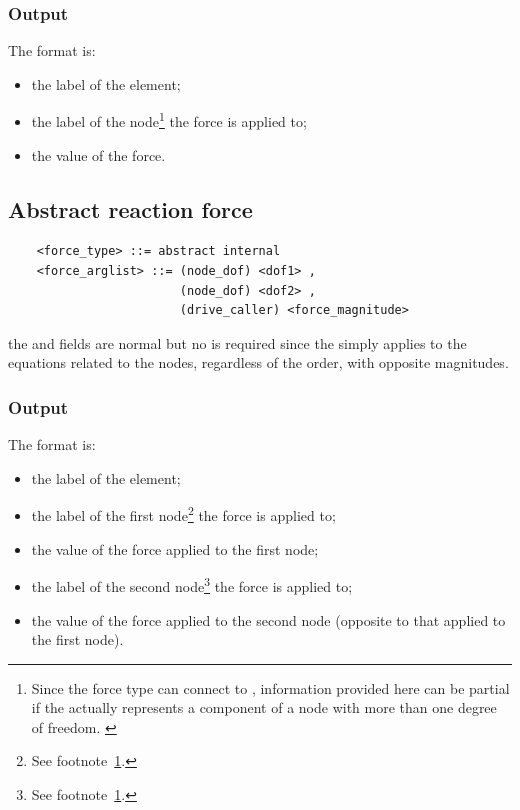 \subsubsection{Output}
The format is:
\begin{itemize}
    \item the label of the element;
    \item the label of the node\footnote{Since the  force type
	can connect to , information provided here
	can be partial if the  actually represents
	a component of a node with more than one degree of freedom.
	\label{footnote:EL:FORCE:ABSTRACT:OUTPUT:node_dof}}
	the force is applied to;
    \item the value of the force.
\end{itemize}

\subsection{Abstract reaction force}
\begin{verbatim}
    <force_type> ::= abstract internal
    <force_arglist> ::= (node_dof) <dof1> ,
                        (node_dof) <dof2> ,
                        (drive_caller) <force_magnitude>
\end{verbatim}
the  and  fields are normal 
but no  is required since the  simply applies
to the equations related to the nodes, regardless of the order, with
opposite magnitudes.

\subsubsection{Output}
The format is:
\begin{itemize}
    \item the label of the element;
    \item the label of the first node\footnote{See
	footnote~\ref{footnote:EL:FORCE:ABSTRACT:OUTPUT:node_dof}.}
	the force is applied to;
    \item the value of the force applied to the first node;
    \item the label of the second node\footnote{See
	footnote~\ref{footnote:EL:FORCE:ABSTRACT:OUTPUT:node_dof}.}
	the force is applied to;
    \item the value of the force applied to the second node
	  (opposite to that applied to the first node).
\end{itemize}

